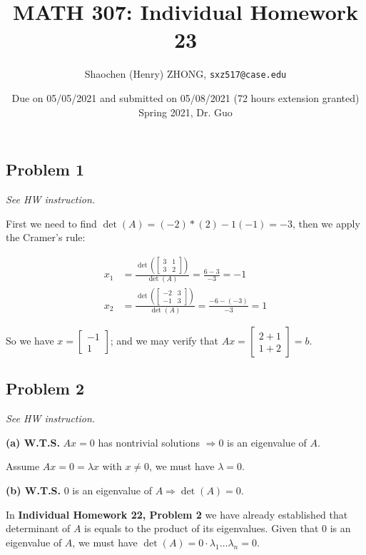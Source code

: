 \documentclass[11pt]{article}
\newcommand{\ilc}{\texttt}
\providecommand{\qbm}[1]{\begin{bmatrix} #1 \end{bmatrix}}
\begin{document}
\title{\textbf{MATH 307: Individual Homework 23}}


\author{Shaochen (Henry) ZHONG, \ilc{sxz517@case.edu}}

\date{Due on 05/05/2021 and submitted on 05/08/2021 (72 hours extension granted) \\ Spring 2021, Dr. Guo}
\maketitle



\subsection*{Problem 1}
\textit{See HW instruction.}\newline

First we need to find $\det(A) = (-2) * (2) - 1(-1) = -3$, then we apply the Cramer's rule:

\begin{align*}
    x_1 &= \frac{\det(\qbm{3 & 1 \\ 3 & 2})}{\det(A)} = \frac{6 - 3}{-3} = -1 \\
    x_2 &= \frac{\det(\qbm{-2 & 3 \\ -1 & 3})}{\det(A)} = \frac{-6 - (-3)}{-3} = 1
\end{align*}

So we have $x = \qbm{-1 \\ 1}$; and we may verify that $Ax = \qbm{2 + 1 \\ 1 + 2} = b$.

\subsection*{Problem 2}
\textit{See HW instruction.}\newline

\noindent\textbf{(a) W.T.S.} $Ax = 0$ has nontrivial solutions $\Longrightarrow 0$ is an eigenvalue of $A$.

Assume $Ax = 0 = \lambda x$ with $x \neq 0$, we must have $\lambda = 0$.\newline

\noindent\textbf{(b) W.T.S.} $0$ is an eigenvalue of $A \Longrightarrow \det(A) = 0$.

In \textbf{Individual Homework 22, Problem 2} we have already established that determinant of $A$ is equals to the product of its eigenvalues. Given that $0$ is an eigenvalue of $A$, we must have $\det(A) = 0 \cdot \lambda_1 \dots \lambda_n = 0$.\newline
\end{document}

